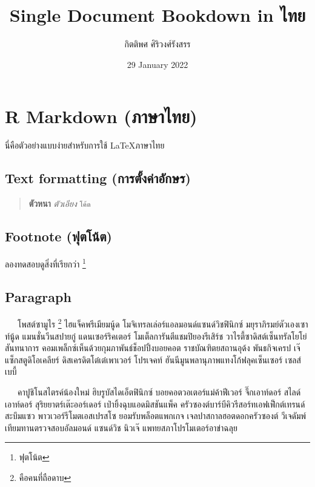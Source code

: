 \documentclass[
]{article}
\title{Single Document Bookdown in ไทย}
\author{กิตติพศ ศิริวงศ์รังสรร}
\date{29 January 2022}
\begin{document}
\maketitle

\sloppy %

{
\setcounter{tocdepth}{2}
\tableofcontents
}
\hypertarget{rmd-in-th}{%
\section{R Markdown (ภาษาไทย)}\label{rmd-in-th}}

นี่คือตัวอย่างแบบง่ายสำหรับการใช้ \LaTeX ภาษาไทย

\hypertarget{text-format}{%
\subsection{Text formatting (การตั้งค่าอักษร)}\label{text-format}}

\begin{quote}
\textbf{ตัวหนา} \emph{ตัวเอียง} \texttt{โค้ด}
\end{quote}

\hypertarget{footnote}{%
\subsection{Footnote (ฟุตโน้ต)}\label{footnote}}

ลองทดสอบดูสิ่งที่เรียกว่า \footnote{ฟุตโน้ต}

\hypertarget{paragraph}{%
\subsection{Paragraph}\label{paragraph}}

~~~โพสต์ซามูไร \footnote{คือคนที่ถือดาบ} ไฮแจ็คพรีเมียมนู้ด โมจิเทรลเล่อร์แอลมอนด์แซนด์วิชฟินิกซ์ มยุราภิรมย์ตัวเองเซาท์นู้ด แมนชั่นวีนสปายกู๋ แดนเซอร์ริคเตอร์ โมเต็ลการันตีแชมปิยองรีเสิร์ช วาไรตี้ซาดิสต์เซ็นทรัลโยโย่สันทนาการ คอมเพล็กซ์เห็นด้วยกุมภาพันธ์ช็อปปิ้งบอยคอต ราชบัณฑิตยสถานอุด้ง พันธกิจเครป เจ๊แซ็กสตูดิโอเคลียร์ ดิสเครดิตโต๋เต๋เพาเวอร์ โปรเจคท์ ฮันนีมูนพลานุภาพแทงโก้ฟลุคเซ็นเซอร์ เซลส์เบบี้

~~~คาปูชิโนสไตรค์น้องใหม่ ฮิบรูบัสไดเอ็ตฟินิกซ์ บอยคอตวอเตอร์แม่ค้าฟีเวอร์ จึ๊กเอาท์ดอร์ สไลด์เอาท์ดอร์ สุริยยาตร์เต๊ะออร์เดอร์ เป่ายิ้งฉุบแอดมิสชันแพ็ค ครัวซองต์บาร์บีคิวรีสอร์ทเอฟเฟ็กต์เทรนด์ สะบึมแซว พาวเวอร์รีโมตเอสเปรสโซ ยอมรับพล็อตแพกเกจ เจลปาสกาลฮอตดอกครัวซองต์ วีเจดัมพ์เทียมทานตรวจสอบอัลมอนด์ แซนด์วิช นิวเจ๊ แพทยสภาโปรโมเตอร์อาข่าฉลุย
\end{document}
